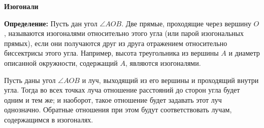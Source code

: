 \documentclass{article}
\begin{document}
\large



\begin{center}
\textbf{Изогонали}
\end{center}

\textbf{Определение:} Пусть дан угол $\angle AOB$. Две прямые, проходящие через вершину $O$, называются изогоналями относительно этого угла (или парой изогональных прямых), если они получаются друг из друга отражением относительно биссектрисы этого угла. Например, высота треугольника из вершины $A$ и диаметр описанной окружности, содержащий $A$, являются изогоналями.

Пусть даны угол $\angle AOB$ и луч, выходящий из его вершины и проходящий внутри угла. Тогда во всех точках луча отношение расстояний до сторон угла будет одним и тем же; и наоборот, такое отношение будет задавать этот луч однозначно. Обратные отношения при этом будут соответствовать лучам, содержащимся в изогоналях.
\end{document}
